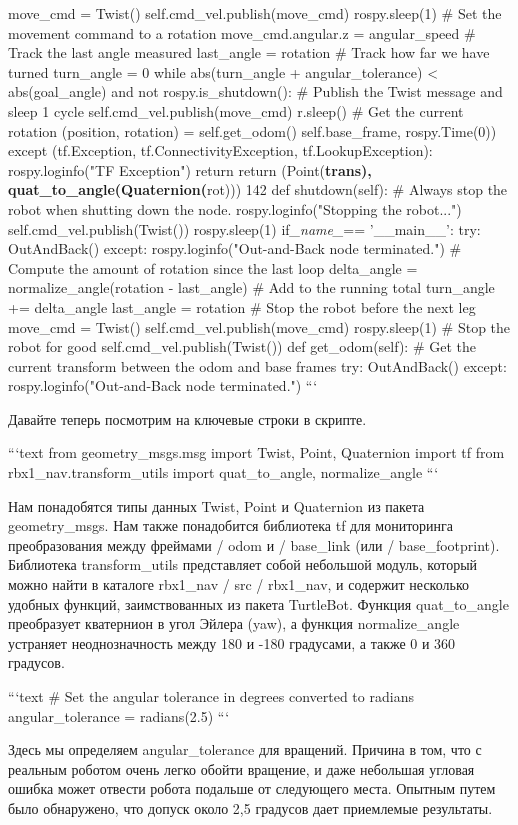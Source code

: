 move_cmd = Twist()
self.cmd_vel.publish(move_cmd)
rospy.sleep(1)
# Set the movement command to a rotation
move_cmd.angular.z = angular_speed
# Track the last angle measured
last_angle = rotation
# Track how far we have turned
turn_angle = 0
while abs(turn_angle + angular_tolerance) < abs(goal_angle) and not rospy.is_shutdown():
# Publish the Twist message and sleep 1 cycle
self.cmd_vel.publish(move_cmd)
r.sleep()
# Get the current rotation
(position, rotation) = self.get_odom()
self.base_frame, rospy.Time(0))
except (tf.Exception, tf.ConnectivityException, tf.LookupException):
rospy.loginfo("TF Exception")
return
return (Point(\textbf{trans), quat_to_angle(Quaternion(}rot))) 142
def shutdown(self):
# Always stop the robot when shutting down the node.
rospy.loginfo("Stopping the robot...")
self.cmd_vel.publish(Twist())
rospy.sleep(1)
if\textit{_name_}== '__main__':
try:
    OutAndBack()
except:
rospy.loginfo("Out-and-Back node terminated.")
# Compute the amount of rotation since the last loop
delta_angle = normalize_angle(rotation - last_angle)
# Add to the running total
turn_angle += delta_angle last_angle = rotation
# Stop the robot before the next leg
move_cmd = Twist() self.cmd_vel.publish(move_cmd) rospy.sleep(1)
# Stop the robot for good
self.cmd_vel.publish(Twist())
def get_odom(self):
# Get the current transform between the odom and base frames try:
OutAndBack()
except:
rospy.loginfo("Out-and-Back node terminated.")
```

Давайте теперь посмотрим на ключевые строки в скрипте.

```text
from geometry_msgs.msg import Twist, Point, Quaternion
import tf
from rbx1_nav.transform_utils import quat_to_angle, normalize_angle
```

Нам понадобятся типы данных Twist, Point и Quaternion из пакета geometry\_msgs. Нам также понадобится библиотека tf для мониторинга преобразования между фреймами / odom и / base\_link (или / base\_footprint). Библиотека transform\_utils представляет собой небольшой модуль, который можно найти в каталоге rbx1\_nav / src / rbx1\_nav, и содержит несколько удобных функций, заимствованных из пакета TurtleBot. Функция quat\_to\_angle преобразует кватернион в угол Эйлера (yaw), а функция normalize\_angle устраняет неоднозначность между 180 и -180 градусами, а также 0 и 360 градусов.

```text
# Set the angular tolerance in degrees converted to radians
angular_tolerance = radians(2.5)
```

Здесь мы определяем angular\_tolerance для вращений. Причина в том, что с реальным роботом очень легко обойти вращение, и даже небольшая угловая ошибка может отвести робота подальше от следующего места. Опытным путем было обнаружено, что допуск около 2,5 градусов дает приемлемые результаты.

